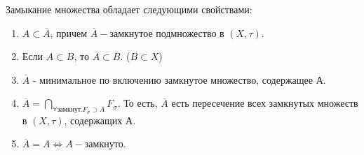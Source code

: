 \begin{theorem} 
 Замыкание множества обладает следующими свойствами:\\
 \begin{enumerate}
     \item $A\subset \overline{A}$, причем $\overline{A}-$замкнутое подмножество в $(X,\tau)$.
 \item Если $A\subset B$, то $\overline{A}\subset \overline{B}$. ($B{\subset}X$)
 \item $\overline{A}$ - минимальное по включению замкнутое множество, 
 содержащее А.
 \item $\overline{A}=\bigcap\limits_{\forall\text{замкнут.}F_{\sigma}{\supset}A} F_\sigma$. То есть, $\overline{A}$ есть пересечение всех замкнутых множеств в $(X,\tau)$, содержащих А.
 \item $\overline{A}=A \Leftrightarrow A-$замкнуто.
 \end{enumerate}
 

\end{theorem}
